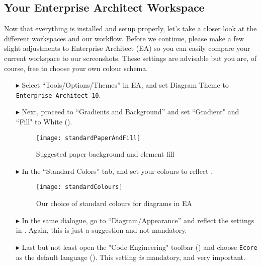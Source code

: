 \genHeader

\subsection{Your Enterprise Architect Workspace}

Now\hypertarget{projectStructure vis}{} that everything is installed and setup properly, let's take a closer look at the different workspaces and our workflow.
Before we continue, please make a few slight adjustments to Enterprise Architect (EA) so you can easily compare your current workspace to our screenshots.
These settings are advisable but you are, of course, free to choose your own colour schema.

\begin{itemize}

\item[$\blacktriangleright$] Select ``Tools/Options/Themes'' in EA, and set Diagram Theme to \texttt{Enterprise Architect 10}.

\item[$\blacktriangleright$] Next, proceed to ``Gradients and Background'' and set ``Gradient" and ``Fill" to White (). 
\vspace{0.5cm}

\begin{figure}[htbp]
    \centering
    \texttt{[image: standardPaperAndFill]}
    \caption{Suggested paper background and element fill}
    \label{ea:paperAndElementFill}
\end{figure}

\vspace{0.5cm}

\item[$\blacktriangleright$] In the ``Standard Colors'' tab, and set your colours to reflect .

\vspace{0.5cm}

\begin{figure}[htbp]
  \centering
  \texttt{[image: standardColours]}
  \caption{Our choice of standard colours for diagrams in EA}
  \label{ea:standardColoursEA}
\end{figure}

\vspace{0.5cm}

\item[$\blacktriangleright$] In the same dialogue, go to ``Diagram/Appearance'' and reflect the settings in .
Again, this is just a suggestion and not mandatory.

\vspace{0.5cm}

\item[$\blacktriangleright$] Last but not least open the "Code Engineering" toolbar () and choose \texttt{Ecore} as the default language (). This setting \emph{is} mandatory, and very important.
\end{itemize}

